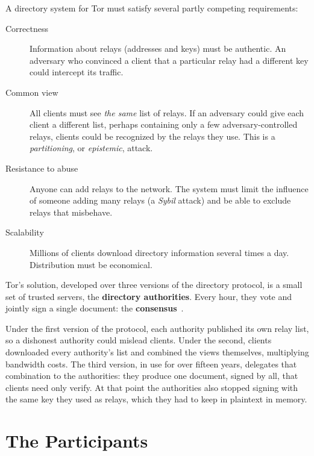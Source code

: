 A directory system for Tor must satisfy several partly competing requirements:
\begin{description}
  \item[Correctness] Information about relays (addresses and keys) must be authentic. An adversary who convinced a client that a particular relay had a different key could intercept its traffic.
  \item[Common view] All clients must see \emph{the same} list of relays. If an adversary could give each client a different list, perhaps containing only a few adversary-controlled relays, clients could be recognized by the relays they use. This is a \emph{partitioning}, or \emph{epistemic}, attack.
  \item[Resistance to abuse] Anyone can add relays to the network. The system must limit the influence of someone adding many relays (a \emph{Sybil} attack) and be able to exclude relays that misbehave.
  \item[Scalability] Millions of clients download directory information several times a day. Distribution must be economical.
\end{description}

Tor's solution, developed over three versions of the directory protocol, is a small set of trusted servers, the \textbf{directory authorities}. Every hour, they vote and jointly sign a single document: the \textbf{consensus}~.

\begin{storia}
Under the first version of the protocol, each authority published its own relay list, so a dishonest authority could mislead clients. Under the second, clients downloaded every authority's list and combined the views themselves, multiplying bandwidth costs. The third version, in use for over fifteen years, delegates that combination to the authorities: they produce one document, signed by all, that clients need only verify. At that point the authorities also stopped signing with the same key they used as relays, which they had to keep in plaintext in memory.
\end{storia}

\section{The Participants}\label{sec:dir-attori}

